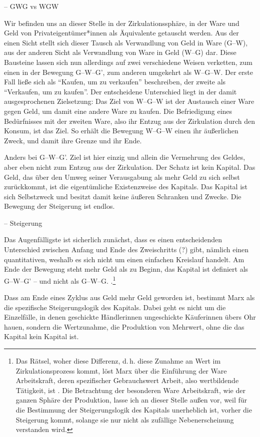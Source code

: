 \documentclass[12pt,
               DIV13,
               paper=a4,
               twoside=false,
               onehalfspacing,
               bibliography=totoc,
               toc=graduated,
               draft,
               ]{scrartcl}
\newcommand{\vgl}[2]{\parencite[vgl.][#1]{#2}}
\newcommand{\worries}[1]{\ifdraft{\textcolor{blue}{\texttt{(#1)}}}{}}
\newcommand{\gwg}{G--W--G'\xspace}
\newcommand{\wgw}{W--G--W\xspace}
\begin{document}
-- GWG vs WGW

Wir befinden uns an dieser Stelle in der Zirkulationssphäre, in der
Ware und Geld von Privateigentümer*innen als Äquivalente getauscht
werden. Aus der einen Sicht stellt sich dieser Tausch als Verwandlung
von Geld in Ware (G--W), aus der anderen Sicht als Verwandlung von
Ware in Geld (W--G) dar. Diese Bausteine lassen sich nun
allerdings auf zwei verschiedene Weisen verketten, zum einen in der 
Bewegung \gwg, zum anderen umgekehrt als \wgw. Der erste Fall
ließe sich als "`Kaufen, um zu verkaufen"' beschreiben, der zweite als
"`Verkaufen, um zu kaufen"'. Der entscheidene Unterschied liegt in der
damit ausgesprochenen Zielsetzung: Das Ziel von \wgw ist der Austausch
einer Ware gegen Geld, um damit eine andere Ware zu kaufen. Die
Befriedigung eines Bedürfnisses mit der zweiten Ware, also ihr Entzug
aus der Zirkulation durch den Konsum, ist das Ziel. So erhält die
Bewegung \wgw einen ihr äußerlichen Zweck, und damit ihre
Grenze und ihr Ende.

Anders bei \gwg. Ziel ist hier einzig und allein die Vermehrung des
Geldes, aber eben nicht zum Entzug aus der Zirkulation. Der Schatz ist
kein Kapital. Das Geld, das über den Umweg seiner Verausgabung als
mehr Geld zu sich selbst zurückkommt, ist die eigentümliche
Existenzweise des Kapitals. Das Kapital ist sich Selbstzweck und
besitzt damit keine äußeren Schranken und Zwecke. Die Bewegung der
Steigerung ist endlos.

-- Steigerung

Das Augenfälligste ist sicherlich zunächst, dass es einen
entscheidenden Unterschied zwischen Anfang und Ende des Zweischritts
(?) gibt, nämlich einen quantitativen, weshalb es sich nicht um einen
einfachen Kreislauf handelt. Am Ende der Bewegung steht mehr Geld als
zu Beginn, das Kapital ist definiert als \gwg{} -- und nicht als
G--W--G. \worries{sonst "`abgeschmackt"' (Marx)}.\footnote{Das Rätsel,
woher diese Differenz, d.\,h. diese Zunahme an Wert im
Zirkulationsprozess kommt, löst Marx über die Einführung der Ware
Arbeitskraft, deren spezifischer Gebrauchswert Arbeit, also
wertbildende Tätigkeit, ist \vgl{xx}{kap}. Die Betrachtung der
besonderen Ware Arbeitskraft, wie der ganzen Sphäre der Produktion,
lasse ich an dieser Stelle außen vor, weil für die Bestimmung der
Steigerungslogik des Kapitals unerheblich ist, vorher die Steigerung
kommt, solange sie nur nicht als zufällige Nebenerscheinung verstanden
wird.}

Dass am Ende eines Zyklus aus Geld mehr Geld geworden ist, bestimmt
Marx als die spezifische Steigerungslogik des Kapitals. Dabei geht es
nicht um die Einzelfälle, in denen geschickte Händlerinnen ungeschickte
Käuferinnen übers Ohr hauen, sondern die Wertzunahme, die Produktion
von Mehrwert, ohne die das Kapital kein Kapital ist.
\end{document}
